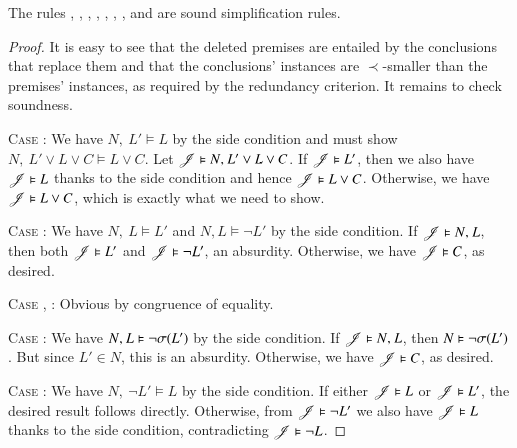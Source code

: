 \begin{theorem}
\begin{sloppypar}
The rules , , ,
, , ,
, and  are sound simplification rules.
\end{sloppypar}
\end{theorem}

\begin{rep}
\begin{proof}
It is easy to see that the deleted premises are entailed by the conclusions that
replace them and that the conclusions' instances are $\prec$-smaller than the
premises' instances, as required by the redundancy criterion. It remains to
check soundness.

\medskip

\noindent
\textsc{Case} :\enskip
We have $N{,}\> L' \models L$ by the side condition and must show
$N{,}\> L' \lor L \lor C \models L \lor C$. Let
$\mathscr{J} \vDash N{,}\> L' \lor L \lor C$. If $\mathscr{J} \vDash L'$, then
we also have $\mathscr{J} \vDash L$ thanks to the side condition and hence
$\mathscr{J} \vDash L \lor C$. Otherwise, we have $\mathscr{J} \vDash L \lor C$,
which is exactly what we need to show.

\medskip

\noindent
\textsc{Case} :\enskip
We have $N{,}\> L \models L'$ and $N, L \models \lnot L'$ by the side condition.
If $\mathscr{J} \vDash N{,}\> L$, then both $\mathscr{J} \vDash L'$ and
$\mathscr{J} \vDash \lnot L'$, an absurdity.
Otherwise, we have $\mathscr{J} \vDash C$, as desired.

\medskip

\noindent
\textsc{Case} , :\enskip
Obvious by congruence of equality.

\medskip

\noindent
\textsc{Case} :\enskip
We have $N{,}\> L \vDash \lnot \sigma(L')$ by the side condition. If $\mathscr{J}
\vDash N{,}\> L$, then $N \vDash \lnot \sigma(L')$. But since $L' \in N$, this is
an absurdity. Otherwise, we have $\mathscr{J} \vDash C$, as desired.

\medskip

\noindent
\textsc{Case} :\enskip
We have $N{,}\> \lnot L' \models L$ by the side condition. If either $\mathscr{J}
\vDash L$ or $\mathscr{J} \vDash L'$, the desired result follows directly.
Otherwise, from $\mathscr{J} \vDash \lnot L'$ we also have $\mathscr{J} \vDash L$
thanks to the side condition, contradicting $\mathscr{J} \vDash \lnot L$.


\end{proof}
\end{rep}
